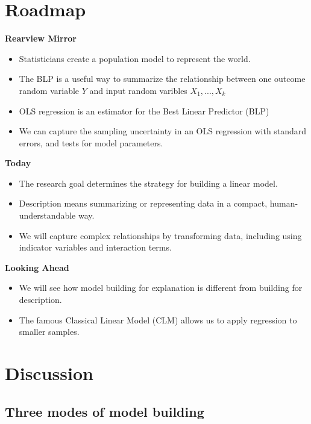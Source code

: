 \documentclass[
]{book}
\theoremstyle{definition}
\theoremstyle{definition}
\theoremstyle{definition}
\theoremstyle{definition}
\theoremstyle{remark}
\begin{document}
\section{Roadmap}\label{roadmap-6}

\textbf{Rearview Mirror}

\begin{itemize}
\item
  Statisticians create a population model to represent the world.
\item
  The BLP is a useful way to summarize the relationship between one outcome random variable \(Y\) and input random varibles \(X_1,...,X_k\)
\item
  OLS regression is an estimator for the Best Linear Predictor (BLP)
\item
  We can capture the sampling uncertainty in an OLS regression with standard errors, and tests for model parameters.
\end{itemize}

\textbf{Today}

\begin{itemize}
\item
  The research goal determines the strategy for building a linear model.
\item
  Description means summarizing or representing data in a compact, human-understandable way.
\item
  We will capture complex relationships by transforming data, including using indicator variables and interaction terms.
\end{itemize}

\textbf{Looking Ahead}

\begin{itemize}
\item
  We will see how model building for explanation is different from building for description.
\item
  The famous Classical Linear Model (CLM) allows us to apply regression to smaller samples.
\end{itemize}

\section{Discussion}\label{discussion}

\subsection{Three modes of model building}\label{three-modes-of-model-building}
\end{document}

